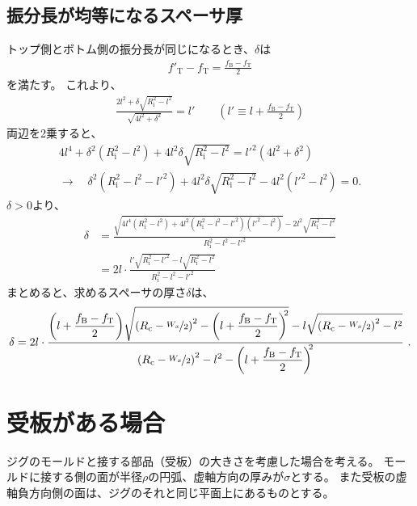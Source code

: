 \subsection{振分長が均等になるスペーサ厚}
トップ側とボトム側の振分長が同じになるとき、$\delta$は
\begin{align*}
  f'_\mathrm T - f_\mathrm T = \frac{f_\mathrm B - f_\mathrm T}2
\end{align*}
を満たす。
これより、
\begin{align*}
  \frac{2l^2+\delta\sqrt{R_\mathrm i^2-l^2}}{\sqrt{4l^2+\delta^2}} = l'\qquad
  \left(l' \equiv l + \frac{f_\mathrm B-f_\mathrm T}2\right)
\end{align*}
両辺を2乗すると、
\begin{gather*}
  4l^4+\delta^2\left(R_\mathrm i^2-l^2\right)+4l^2\delta\sqrt{R_\mathrm i^2-l^2}
  = l'^2\left(4l^2+\delta^2\right)\\
  \longrightarrow\quad
  \delta^2\left(R_\mathrm i^2-l^2-l'^2\right)
  +4l^2\delta\sqrt{R_\mathrm i^2-l^2} -4l^2\left(l'^2 - l^2\right)
  = 0.
\end{gather*}
$\delta > 0$より、
\begin{align*}
  \delta
  &= \frac{\sqrt{4l^4\left(R_\mathrm i^2-l^2\right)
                 +4l^2\left(R_\mathrm i^2-l^2-l'^2\right)\left(l'^2 - l^2\right)}
           -2l^2\sqrt{R_\mathrm i^2-l^2}}{R_\mathrm i^2-l^2-l'^2}\\
  &= 2l\cdot\frac{l'\sqrt{R_\mathrm i^2-l'^2}-l\sqrt{R_\mathrm i^2-l^2}}{R_\mathrm i^2-l^2-l'^2}
\end{align*}
まとめると、求めるスペーサの厚さ$\delta$は、
\begin{align*}
  \delta
  = 2l\cdot
    \frac{\displaystyle
          \left(l+\frac{f_\mathrm B-f_\mathrm T}2\right)\!
          \sqrt{\left(R_\mathrm c-\nicefrac{W_x}2\right)^2
                -\left(l+\frac{f_\mathrm B-f_\mathrm T}2\right)^{\!\!2}}
          -l\sqrt{\left(R_\mathrm c-\nicefrac{W_x}2\right)^2-l^2}}
         {\displaystyle
          \left(R_\mathrm c-\nicefrac{W_x}2\right)^2-l^2
          -\left(l+\frac{f_\mathrm B-f_\mathrm T}2\right)^{\!\!2}}~.
\end{align*}




\clearpage
\section{受板がある場合}
ジグのモールドと接する部品（受板）の大きさを考慮した場合を考える。
モールドに接する側の面が半径$\rho$の円弧、虚軸方向の厚みが$\sigma$とする。
また受板の虚軸負方向側の面は、ジグのそれと同じ平面上にあるものとする。

